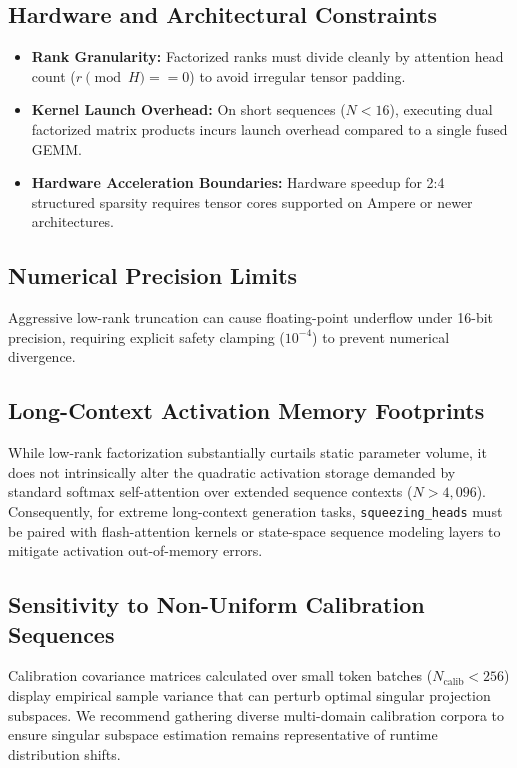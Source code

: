 \subsection{Hardware and Architectural Constraints}
\begin{itemize}
\item \textbf{Rank Granularity:} Factorized ranks must divide cleanly by attention head count ($r \pmod H == 0$) to avoid irregular tensor padding.
\item \textbf{Kernel Launch Overhead:} On short sequences ($N < 16$), executing dual factorized matrix products incurs launch overhead compared to a single fused GEMM.
\item \textbf{Hardware Acceleration Boundaries:} Hardware speedup for 2:4 structured sparsity requires tensor cores supported on Ampere or newer architectures.
\end{itemize}

\subsection{Numerical Precision Limits}
Aggressive low-rank truncation can cause floating-point underflow under 16-bit precision, requiring explicit safety clamping ($10^{-4}$) to prevent numerical divergence.

\subsection{Long-Context Activation Memory Footprints}
While low-rank factorization substantially curtails static parameter volume, it does not intrinsically alter the quadratic activation storage demanded by standard softmax self-attention over extended sequence contexts ($N > 4{,}096$). Consequently, for extreme long-context generation tasks, \texttt{squeezing\_heads} must be paired with flash-attention kernels or state-space sequence modeling layers to mitigate activation out-of-memory errors.

\subsection{Sensitivity to Non-Uniform Calibration Sequences}
Calibration covariance matrices calculated over small token batches ($N_{\text{calib}} < 256$) display empirical sample variance that can perturb optimal singular projection subspaces. We recommend gathering diverse multi-domain calibration corpora to ensure singular subspace estimation remains representative of runtime distribution shifts.


